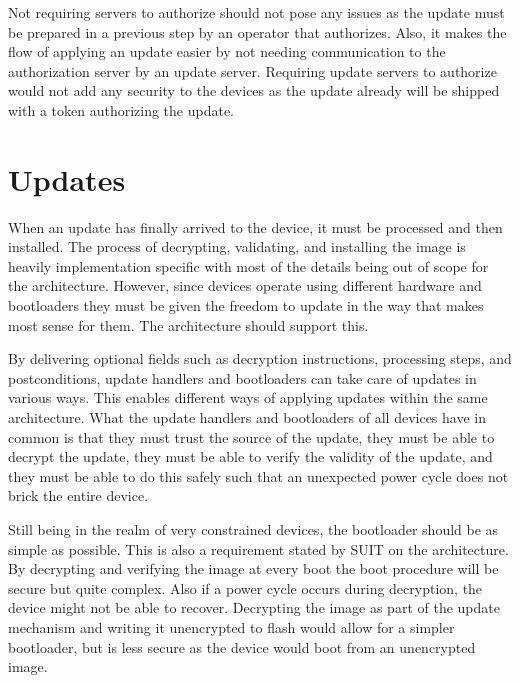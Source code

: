 \documentclass[0-thesis.tex]{subfiles}
\begin{document}
Not requiring servers to authorize should not pose any issues as the update must be
prepared in a previous step by an operator that authorizes. Also, it makes the flow of
applying an update easier by not needing communication to the authorization server by an
update server. Requiring update servers to authorize would not add any security to the
devices as the update already will be shipped with a token authorizing the update.



\section{Updates}
\label{sec:updates}
When an update has finally arrived to the device, it must be processed and then installed.
The process of decrypting, validating, and installing the image is heavily implementation
specific with most of the details being out of scope for the architecture. However, since
devices operate using different hardware and bootloaders they must be given the freedom
to update in the way that makes most sense for them. The architecture should support this.

By delivering optional fields such as decryption instructions, processing steps, and
postconditions, update handlers and bootloaders can take care of updates in various ways.
This enables different ways of applying updates within the same architecture. What the
update handlers and bootloaders of all devices have in common is that they must trust the
source of the update, they must be able to decrypt the update, they must be able to verify
the validity of the update, and they must be able to do this safely such that an
unexpected power cycle does not brick the entire device.

Still being in the realm of very constrained devices, the bootloader should be as simple
as possible. This is also a requirement stated by SUIT on the architecture. By decrypting
and verifying the image at every boot the boot procedure will be secure but
quite complex. Also if a power cycle occurs during decryption, the device might not be
able to recover. Decrypting the image as part of the update mechanism and writing it
unencrypted to flash would allow for a simpler bootloader, but is less secure as the
device would boot from an unencrypted image.
\end{document}
